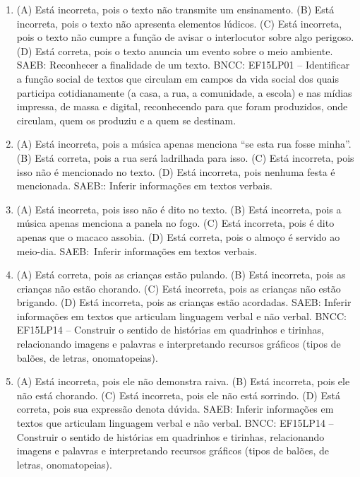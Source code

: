 \begin{enumerate}
\item
(A) Está incorreta, pois o texto não transmite um ensinamento.
(B) Está incorreta, pois o texto não apresenta elementos lúdicos.
(C) Está incorreta, pois o texto não cumpre a função de avisar o interlocutor sobre algo perigoso.
(D) Está correta, pois o texto anuncia um evento sobre o meio ambiente.
SAEB: Reconhecer a finalidade de um texto.
BNCC: EF15LP01 -- Identificar a função social de textos que
circulam em campos da vida social dos quais participa cotidianamente (a
casa, a rua, a comunidade, a escola) e nas mídias impressa, de massa e
digital, reconhecendo para que foram produzidos, onde circulam, quem os
produziu e a quem se destinam.

\item
(A) Está incorreta, pois a música apenas menciona ``se esta rua fosse minha''.
(B) Está correta, pois a rua será ladrilhada para isso.
(C) Está incorreta, pois isso não é mencionado no texto.
(D) Está incorreta, pois nenhuma festa é mencionada.
SAEB:: Inferir informações em textos verbais.

\item
(A) Está incorreta, pois isso não é dito no texto.
(B) Está incorreta, pois a música apenas menciona a panela no fogo.
(C) Está incorreta, pois é dito apenas que o macaco assobia.
(D) Está correta, pois o almoço é servido ao meio-dia.
SAEB:~Inferir informações em textos verbais.

\item
(A) Está correta, pois as crianças estão pulando.
(B) Está incorreta, pois as crianças não estão chorando.
(C) Está incorreta, pois as crianças não estão brigando.
(D) Está incorreta, pois as crianças estão acordadas.
SAEB: Inferir informações em textos que articulam linguagem verbal e não verbal.
BNCC: EF15LP14 -- Construir o sentido de histórias em quadrinhos
e tirinhas, relacionando imagens e palavras e interpretando recursos
gráficos (tipos de balões, de letras, onomatopeias).

\item
(A) Está incorreta, pois ele não demonstra raiva.
(B) Está incorreta, pois ele não está chorando.
(C) Está incorreta, pois ele não está sorrindo.
(D) Está correta, pois sua expressão denota dúvida.
SAEB: Inferir informações em textos que articulam linguagem verbal e não verbal.
BNCC: EF15LP14 -- Construir o sentido de histórias em quadrinhos e tirinhas, relacionando imagens e palavras e interpretando recursos gráficos (tipos de balões, de letras, onomatopeias).
\end{enumerate}

